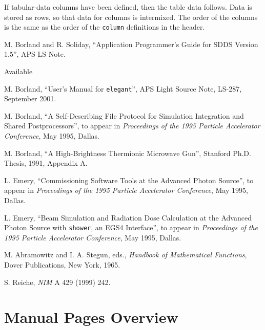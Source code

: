 \documentclass[11pt]{article}
\begin{document}
If tabular-data columns have been defined, then the table data follows.
Data is stored as rows, so that data for columns is intermixed.  The
order of the columns is the same as the order of the {\tt column} definitions
in the header.

\begin{thebibliography}{9}

    M. Borland and R. Soliday, ``Application Programmer's Guide for SDDS Version
1.5'', APS LS Note.
\begin{htmlonly} Available 
\end{htmlonly}

        M. Borland, ``User's Manual for {\tt elegant}'', 
        APS Light Source Note, LS-287, September 2001.

        M. Borland, ``A Self-Describing File Protocol for Simulation Integration and Shared Postprocessors'',
        to appear in {\em Proceedings of the 1995 Particle Accelerator Conference}, May 1995, Dallas.

        M. Borland, ``A High-Brightness Thermionic Microwave Gun'', Stanford Ph.D. Thesis, 1991, Appendix A.

        L. Emery, ``Commissioning Software Tools at the Advanced Photon Source'', 
        to appear in {\em Proceedings of the 1995 Particle Accelerator Conference}, May 1995, Dallas.

        L. Emery, ``Beam Simulation and Radiation Dose Calculation at the Advanced Photon Source with
        {\tt shower}, an EGS4 Interface'',
         to appear in {\em Proceedings of the 1995 Particle Accelerator Conference}, May 1995, Dallas.

        M. Abramowitz and I. A. Stegun, eds., {\em Handbook of Mathematical Functions}, Dover Publications,
        New York, 1965.

 S. Reiche, {\em NIM} A 429 (1999) 242.

\end{thebibliography}

\newpage
\section{Manual Pages Overview}

\label{ManualPagesOverview}
\end{document}
